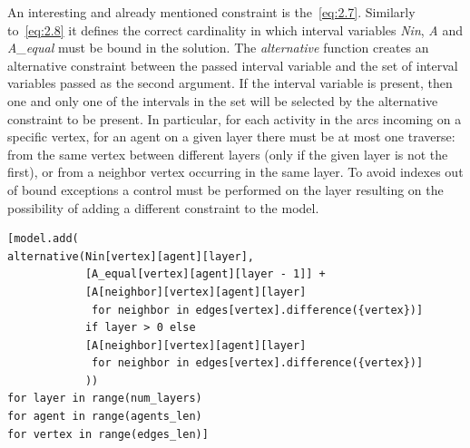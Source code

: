 \documentclass[12pt, a4paper, hidelinks]{article}
\numberwithin{equation}{section}
\begin{document}
An interesting and already mentioned constraint is the~\ref{eq:2.7}.
Similarly to~\ref{eq:2.8} it defines the correct cardinality in which interval variables \textit{Nin}, \textit{A} and \textit{A\_equal} must be bound in the solution.
The \textit{alternative} function creates an alternative constraint between the passed interval variable and the set of interval variables passed as the second argument.
If the interval variable is present, then one and only one of the intervals in the set will be selected by the alternative constraint to be present.
In particular, for each activity in the arcs incoming on a specific vertex, for an agent on a given layer there must be at most one traverse: from the same vertex between different layers (only if the given layer is not the first), or from a neighbor vertex occurring in the same layer.
To avoid indexes out of bound exceptions a control must be performed on the layer resulting on the possibility of adding a different constraint to the model.

\begin{lstlisting}[label={lst:eq2.7}]
[model.add(
alternative(Nin[vertex][agent][layer],
            [A_equal[vertex][agent][layer - 1]] +
            [A[neighbor][vertex][agent][layer]
             for neighbor in edges[vertex].difference({vertex})]
            if layer > 0 else
            [A[neighbor][vertex][agent][layer]
             for neighbor in edges[vertex].difference({vertex})]
            ))
for layer in range(num_layers)
for agent in range(agents_len)
for vertex in range(edges_len)]
\end{lstlisting}
\end{document}
